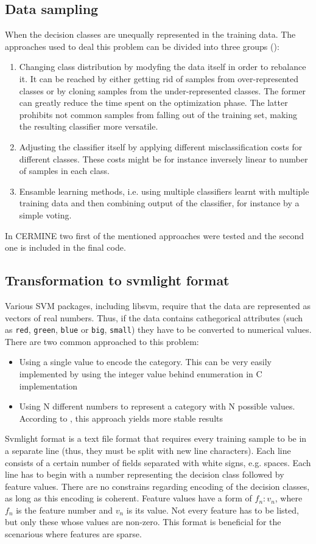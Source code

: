 \subsection{Data sampling}
When the decision classes are unequally represented in the training data. The approaches used to deal this problem can be divided into three groups (\cite{Choi}):
\begin{enumerate}
\item Changing class distribution by modyfing the data itself in order to rebalance it. It can be reached by either getting rid of samples from over-represented classes or by cloning samples from the under-represented classes. The former can greatly reduce the time spent on the optimization phase. The latter prohibits not common samples from falling out of the training set, making the resulting classifier more versatile.
\item Adjusting the classifier itself by applying different misclassification costs for different classes. These costs might be for instance inversely linear to number of samples in each class.
\item Ensamble learning methods, i.e. using multiple classifiers learnt with multiple training data and then combining output of the classifier, for instance by a simple voting.
\end{enumerate}
In CERMINE two first of the mentioned approaches were tested and the second one is included in the final code.
\subsection{Transformation to svmlight format}
Various SVM packages, including libsvm, require that the data are represented as vectors of real numbers. Thus, if the data contains cathegorical attributes (such as \verb+red+, \verb+green+, \verb+blue+ or \verb+big+, \verb+small+) they have to be converted to numerical values. There are two common approached to this problem:
\begin{itemize}
\item Using a single value to encode the category. This can be very easily implemented by using the integer value behind enumeration in C implementation
\item Using N different numbers to represent a category with N possible values. According to \cite{Chih-WeiHsu2010}, this approach yields more stable results
\end{itemize}
\qquad
Svmlight format is a text file format that requires every training sample to be in a separate line (thus, they must be split with new line characters). Each line consists of a certain number of fields separated with white signs, e.g. spaces. Each line has to begin with a number representing the decision class followed by feature values. There are no constrains regarding encoding of the decision classes, as long as this encoding is coherent. Feature values have a form of $f_n:v_n$, where $f_n$ is the feature number and $v_n$ is its value. Not every feature has to be listed, but only these whose values are non-zero. This format is beneficial for the scenarious where features are sparse.

